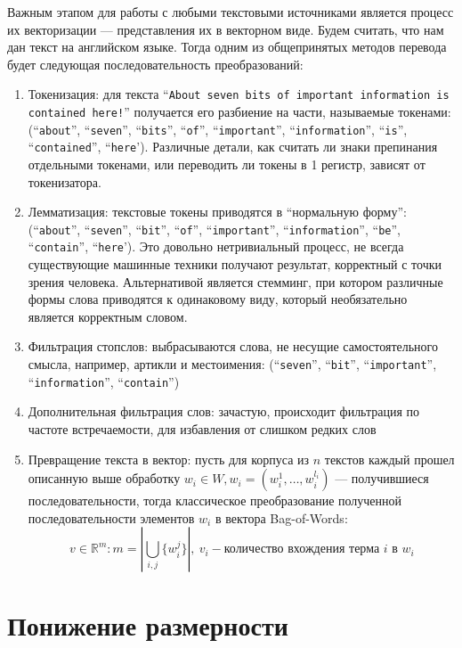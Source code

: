 \documentclass[pdftex,ptm,14pt,a4paper]{extreport}
\begin{document}
Важным этапом для работы с любыми текстовыми источниками является процесс их векторизации --- представления их в векторном
виде. Будем считать, что нам дан текст на английском языке. Тогда одним из общепринятых методов перевода будет следующая
последовательность преобразований:
\begin{enumerate}
\item Токенизация\cite{info_retrieval}: для текста ``\texttt{About seven bits of important information is contained here!}'' получается
его разбиение на части, называемые токенами: (``\texttt{about}'', ``\texttt{seven}'', ``\texttt{bits}'', ``\texttt{of}'',
``\texttt{important}'', ``\texttt{information}'', ``\texttt{is}'', ``\texttt{contained}'', ``\texttt{here}'). Различные детали, как считать ли знаки препинания отдельными токенами, или переводить ли токены в 1 регистр, зависят от
токенизатора.
\item Лемматизация\cite{info_retrieval}: текстовые токены приводятся в ``нормальную форму'':
(``\texttt{about}'', ``\texttt{seven}'', ``\texttt{bit}'', ``\texttt{of}'',
``\texttt{important}'', ``\texttt{information}'', ``\texttt{be}'', ``\texttt{contain}'', ``\texttt{here}').
Это довольно нетривиальный процесс, не всегда существующие машинные техники получают результат, корректный с точки
зрения человека. Альтернативой является стемминг, при котором различные формы слова приводятся к одинаковому виду,
который необязательно является корректным словом.
\item Фильтрация стопслов: выбрасываются слова, не несущие самостоятельного смысла, например, артикли и местоимения:
(``\texttt{seven}'', ``\texttt{bit}'', ``\texttt{important}'', ``\texttt{information}'', ``\texttt{contain}'')
\item Дополнительная фильтрация слов: зачастую, происходит фильтрация по частоте встречаемости, для избавления от слишком редких
слов
\item Превращение текста в вектор: пусть для корпуса из $n$ текстов каждый прошел описанную выше обработку $w_i \in W,
w_i=(w_i^1,\ldots,w_i^{l_i})$ --- получившиеся последовательности, тогда классическое преобразование
полученной последовательности элементов $w_i$ в вектора Bag-of-Words\cite{info_retrieval}:
\begin{equation}
v\in\mathbb{R}^m: m=\left|\bigcup_{i,j} \{w^j_i\}\right|,\ v_i - \text{количество вхождения терма } i\text{ в } w_i
\end{equation}
\end{enumerate}

\section{Понижение размерности}
\end{document}
